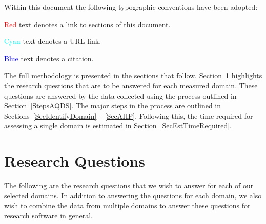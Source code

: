 \documentclass[letterpaper,cleveref]{lipics-v2019}
\begin{document}
Within this document the following typographic conventions have been adopted:
\begin{inparaenum}[i)] 
  \item \textcolor{red}{Red} text denotes a link to sections of this document. 
  \item \textcolor{cyan}{Cyan} text denotes a URL link.
  \item \textcolor{blue}{Blue} text denotes a citation.
\end{inparaenum}

The full methodology is presented in the sections that follow.
Section~\ref{SecResearchQuestions} highlights the research questions that are to
be answered for each measured domain. These questions are answered by the data
collected using the process outlined in Section~\ref{StepsAQDS}.  The major
steps in the process are outlined in Sections~\ref{SecIdentifyDomain} --
\ref{SecAHP}.  Following this, the time required for assessing a single domain
is estimated in Section~\ref{SecEstTimeRequired}.

\section{Research Questions} \label{SecResearchQuestions}

The following are the research questions that we wish to answer for each of our
selected domains.  In addition to answering the questions for each domain, we
also wish to combine the data from multiple domains to answer these questions
for research software in general.
\end{document}
